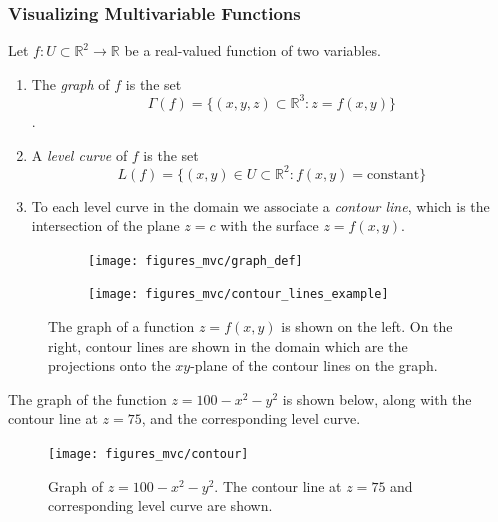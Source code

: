 \documentclass[12pt,letterpaper,reqno]{article}
\numberwithin{equation}{section}
\begin{document}
{\subsubsection{Visualizing Multivariable Functions}
\begin{defn}
	Let $f:U \subset \mathbb{R}^2 \to \mathbb{R}$ be a real-valued function of two variables.  
\begin{enumerate}[(1)]
	\item The \emph{graph} of $f$ is the set $$\Gamma(f)=\{(x,y,z) \subset \mathbb{R}^3:z=f(x,y)\}$$.
	\item A \emph{level curve} of $f$ is the set
	$$L(f)=\{(x,y) \in U \subset \mathbb{R}^2:f(x,y)=\text{constant}\}$$
	\item To each level curve in the domain we associate a \emph{contour line}, which is the intersection of the plane $z=c$ with the surface $z=f(x,y)$. \\
\end{enumerate}
\end{defn}

\begin{figure}[h]
\centering
\begin{subfigure}{.5\textwidth}
  \centering
  \texttt{[image: figures\_mvc/graph\_def]}
\end{subfigure}%
\begin{subfigure}{.5\textwidth}
  \centering
  \texttt{[image: figures\_mvc/contour\_lines\_example]}
\end{subfigure}
\caption{The graph of a function $z=f(x,y)$ is shown on the left. On the right, contour lines are shown in the domain which are the projections onto the $xy$-plane of the contour lines on the graph.}
\end{figure}

\newpage
\begin{example}
The graph of the function $z=100-x^2-y^2$ is shown below, along with the contour line at $z=75$, and the corresponding level curve.
\begin{figure}[h]
	\begin{center}
	\texttt{[image: figures\_mvc/contour]}
\end{center}
\caption{Graph of $z=100-x^2-y^2$. The contour line at $z=75$ and corresponding level curve are shown.}
\end{figure}
	

\end{example}}
\end{document}
